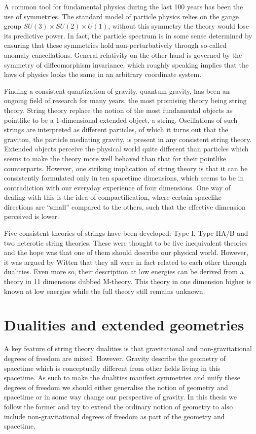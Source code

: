 A common tool for fundamental physics during the last 100 years has been the use of symmetries. The standard model of particle physics relies on the gauge group $SU(3)\times SU(2)\times U(1)$, without this symmetry the theory would lose its predictive power. In fact, the particle spectrum is in some sense determined by ensuring that these symmetries hold non-perturbatively through so-called anomaly cancellations. General relativity on the other hand is governed by the symmetry of diffeomorphism invariance, which roughly speaking implies that the laws of physics looks the same in an arbitrary coordinate system. 

Finding a consistent quantization of gravity, quantum gravity, has been an ongoing field of research for many years, the most promising theory being string theory. String theory replace the notion of the most fundamental objects as pointlike to be a 1-dimensional extended object, a string. Oscillations of such strings are interpreted as different particles, of which it turns out that the graviton, the particle mediating gravity, is present in any consistent string theory. Extended objects perceive the physical world quite different than particles which seems to make the theory more well behaved than that for their pointlike counterparts. However, one striking implication of string theory is that it can be consistently formulated only in ten spacetime dimensions, which seems to be in contradiction with our everyday experience of four dimensions. One way of dealing with this is the idea of compactification, where certain spacelike directions are ``small'' compared to the others, such that the effective dimension perceived is lower. 

Five consistent theories of strings have been developed: Type I, Type IIA/B and two heterotic string theories. These were thought to be five inequivalent theories and the hope was that one of them should describe our physical world. However, it was argued by Witten \cite{WittenDualities1995} that they all were in fact related to each other through dualities. Even more so, their description at low energies can be derived from a theory in 11 dimensions dubbed M-theory. This theory in one dimension higher is known at low energies while the full theory still remains unknown.

\section{Dualities and extended geometries}
A key feature of string theory dualities is that gravitational and non-gravitational degrees of freedom are mixed. However, Gravity describe the geometry of spacetime which is conceptually different from other fields living in this spacetime. As such to make the dualities manifest symmetries and unify these degrees of freedom we should either generalise the notion of geometry and spacetime or in some way change our perspective of gravity. In this thesis we follow the former and try to extend the ordinary notion of geometry to also include non-gravitational degrees of freedom as part of the geometry and spacetime. 

